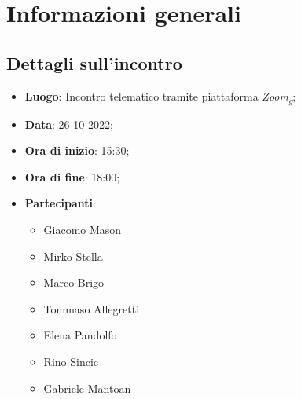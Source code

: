 \section{Informazioni generali}

\subsection{Dettagli sull'incontro}
\begin{itemize}
\item \textbf{Luogo}: Incontro telematico tramite piattaforma \textit{Zoom\textsubscript{g}};
\item \textbf{Data}: 26-10-2022;
\item \textbf{Ora di inizio}: 15:30;
\item \textbf{Ora di fine}: 18:00;
\item \textbf{Partecipanti}: 
\begin{itemize}
	\item Giacomo Mason
	\item Mirko Stella
	\item Marco Brigo
	\item Tommaso Allegretti
	\item Elena Pandolfo
	\item Rino Sincic
	\item Gabriele Mantoan
\end{itemize}
\end{itemize}



